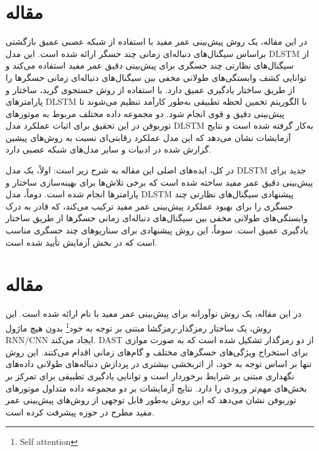 \documentclass[a4paper,10pt]{article}
\begin{document}

	\section{مقاله \textcolor{blue}{\cite{article39}}}
در این مقاله، یک روش پیش‌بینی عمر مفید با استفاده از شبکه عصبی عمیق بازگشتی  براساس سیگنال‌های دنباله‌ای زمانی چند حسگر ارائه شده است. این مدل DLSTM از سیگنال‌های نظارتی چند حسگری برای پیش‌بینی دقیق عمر مفید استفاده می‌کند و توانایی کشف وابستگی‌های طولانی مخفی بین سیگنال‌های دنباله‌ای زمانی حسگرها را از طریق ساختار یادگیری عمیق دارد. با استفاده از روش جستجوی گرید، ساختار و پارامترهای DLSTM با الگوریتم تخمین لحظه تطبیقی به‌طور کارآمد تنظیم می‌شوند تا پیش‌بینی دقیق و قوی انجام شود. دو مجموعه داده مختلف مربوط به موتورهای توربوفن در این تحقیق برای اثبات عملکرد مدل DLSTM به‌کار گرفته شده است و نتایج آزمایشات نشان می‌دهد که این مدل عملکرد رقابتی‌ای نسبت به روش‌های پیشین گزارش شده در ادبیات و سایر مدل‌های شبکه عصبی دارد.

در کل، ایده‌های اصلی این مقاله به شرح زیر است: اولاً، یک مدل DLSTM جدید برای پیش‌بینی دقیق عمر مفید ساخته شده است که برخی تلاش‌ها برای بهینه‌سازی ساختار و پارامترها انجام شده است. دوماً، مدل DLSTM پیشنهادی سیگنال‌های نظارتی چند حسگری را برای بهبود عملکرد پیش‌بینی عمر مفید ترکیب می‌کند، که قادر به درک وابستگی‌های طولانی مخفی بین سیگنال‌های دنباله‌ای زمانی حسگرها از طریق ساختار یادگیری عمیق است. سوماً، این روش پیشنهادی برای سناریوهای چند حسگری مناسب است که در بخش آزمایش تأیید شده است.


	\section{مقاله \textcolor{blue}{\cite{article47}}}
در این مقاله، یک روش نوآورانه برای پیش‌بینی عمر مفید با نام  ارائه شده است. این روش، یک ساختار رمزگذار-رمزگشا مبتنی بر توجه به خود\footnote{Self attention} بدون هیچ ماژول RNN/CNN ایجاد می‌کند. DAST از دو رمزگذار تشکیل شده است که به صورت موازی برای استخراج ویژگی‌های حسگرهای مختلف و گام‌های زمانی اقدام می‌کنند. این روش تنها بر اساس توجه به خود، از اثربخشی بیشتری در پردازش دنباله‌های طولانی داده‌های نگهداری مبتنی بر شرایط برخوردار است و توانایی یادگیری تطبیقی برای تمرکز بر بخش‌های مهم‌تر ورودی را دارد. نتایج آزمایشات بر دو مجموعه داده متداول موتورهای توربوفن نشان می‌دهد که این روش به‌طور قابل توجهی از روش‌های پیش‌بینی عمر مفید مطرح در حوزه پیشرفت کرده است.
\end{document}
